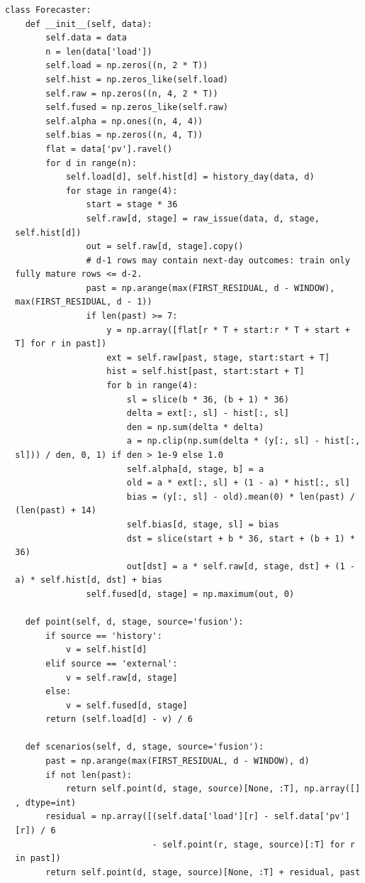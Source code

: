 \begin{verbatim}
class Forecaster:
    def __init__(self, data):
        self.data = data
        n = len(data['load'])
        self.load = np.zeros((n, 2 * T))
        self.hist = np.zeros_like(self.load)
        self.raw = np.zeros((n, 4, 2 * T))
        self.fused = np.zeros_like(self.raw)
        self.alpha = np.ones((n, 4, 4))
        self.bias = np.zeros((n, 4, T))
        flat = data['pv'].ravel()
        for d in range(n):
            self.load[d], self.hist[d] = history_day(data, d)
            for stage in range(4):
                start = stage * 36
                self.raw[d, stage] = raw_issue(data, d, stage,
  self.hist[d])
                out = self.raw[d, stage].copy()
                # d-1 rows may contain next-day outcomes: train only
  fully mature rows <= d-2.
                past = np.arange(max(FIRST_RESIDUAL, d - WINDOW),
  max(FIRST_RESIDUAL, d - 1))
                if len(past) >= 7:
                    y = np.array([flat[r * T + start:r * T + start +
  T] for r in past])
                    ext = self.raw[past, stage, start:start + T]
                    hist = self.hist[past, start:start + T]
                    for b in range(4):
                        sl = slice(b * 36, (b + 1) * 36)
                        delta = ext[:, sl] - hist[:, sl]
                        den = np.sum(delta * delta)
                        a = np.clip(np.sum(delta * (y[:, sl] - hist[:,
  sl])) / den, 0, 1) if den > 1e-9 else 1.0
                        self.alpha[d, stage, b] = a
                        old = a * ext[:, sl] + (1 - a) * hist[:, sl]
                        bias = (y[:, sl] - old).mean(0) * len(past) /
  (len(past) + 14)
                        self.bias[d, stage, sl] = bias
                        dst = slice(start + b * 36, start + (b + 1) *
  36)
                        out[dst] = a * self.raw[d, stage, dst] + (1 -
  a) * self.hist[d, dst] + bias
                self.fused[d, stage] = np.maximum(out, 0)

    def point(self, d, stage, source='fusion'):
        if source == 'history':
            v = self.hist[d]
        elif source == 'external':
            v = self.raw[d, stage]
        else:
            v = self.fused[d, stage]
        return (self.load[d] - v) / 6

    def scenarios(self, d, stage, source='fusion'):
        past = np.arange(max(FIRST_RESIDUAL, d - WINDOW), d)
        if not len(past):
            return self.point(d, stage, source)[None, :T], np.array([]
  , dtype=int)
        residual = np.array([(self.data['load'][r] - self.data['pv']
  [r]) / 6
                             - self.point(r, stage, source)[:T] for r
  in past])
        return self.point(d, stage, source)[None, :T] + residual, past


\end{verbatim}
